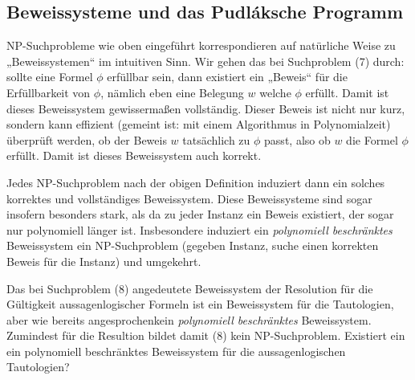 \subsection*{Beweissysteme und das Pudláksche Programm}

NP-Suchprobleme wie oben eingeführt korrespondieren auf natürliche Weise zu „Beweissystemen“ im intuitiven Sinn. Wir gehen das bei Suchproblem (7) durch: sollte eine Formel $\phi$ erfüllbar sein, dann existiert ein „Beweis“ für die Erfüllbarkeit von $\phi$, nämlich eben eine Belegung $w$ welche $\phi$ erfüllt. Damit ist dieses Beweissystem gewissermaßen vollständig.
Dieser Beweis ist nicht nur kurz, sondern kann effizient (gemeint ist: mit einem Algorithmus in Polynomialzeit) überprüft werden, ob der Beweis $w$ tatsächlich zu $\phi$ passt, also ob $w$ die Formel $\phi$ erfüllt. Damit ist dieses Beweissystem auch korrekt.

Jedes NP-Suchproblem nach der obigen Definition induziert dann ein solches korrektes und vollständiges Beweissystem. Diese Beweissysteme sind sogar insofern besonders stark, als da zu jeder Instanz ein Beweis existiert, der sogar nur polynomiell länger ist.
Insbesondere induziert ein \emph{polynomiell beschränktes} Beweissystem ein NP-Suchproblem (gegeben Instanz, suche einen korrekten Beweis für die Instanz) und umgekehrt.

Das bei Suchproblem (8) angedeutete Beweissystem der Resolution für die Gültigkeit aussagenlogischer Formeln ist ein Beweissystem für die Tautologien, aber wie bereits angesprochenkein \emph{polynomiell beschränktes} Beweissystem. Zumindest für die Resultion bildet damit (8) kein NP-Suchproblem. 
Existiert ein ein polynomiell beschränktes Beweissystem für die aussagenlogischen Tautologien?

